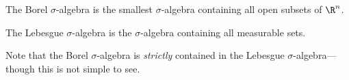 \begin{dfn}
The Borel $\sigma$-algebra is the smallest $\sigma$-algebra containing all open subsets of $\R^n$. 
\end{dfn}


\begin{dfn}
The Lebesgue $\sigma$-algebra is the $\sigma$-algebra containing all measurable sets. 
\end{dfn}

Note that the Borel $\sigma$-algebra is \emph{strictly} contained in the Lebesgue $\sigma$-algebra---though this is not simple to see. 
























